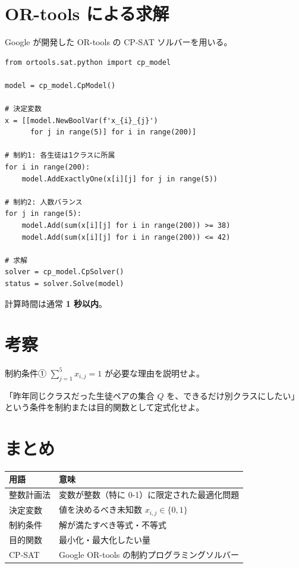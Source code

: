 \documentclass[a4paper, 11pt, fleqn]{ltjsarticle}
\begin{document}
\section{OR-tools による求解}

Google が開発した OR-tools の CP-SAT ソルバーを用いる。

\begin{verbatim}
from ortools.sat.python import cp_model

model = cp_model.CpModel()

# 決定変数
x = [[model.NewBoolVar(f'x_{i}_{j}')
      for j in range(5)] for i in range(200)]

# 制約1: 各生徒は1クラスに所属
for i in range(200):
    model.AddExactlyOne(x[i][j] for j in range(5))

# 制約2: 人数バランス
for j in range(5):
    model.Add(sum(x[i][j] for i in range(200)) >= 38)
    model.Add(sum(x[i][j] for i in range(200)) <= 42)

# 求解
solver = cp_model.CpSolver()
status = solver.Solve(model)
\end{verbatim}

計算時間は通常 \textbf{1 秒以内}。

\section{考察}

\mondai[基本]
制約条件① $\displaystyle\sum_{j=1}^{5} x_{i,j} = 1$ が必要な理由を説明せよ。

\begin{answerbox}
  \vspace{2.5cm}
\end{answerbox}

\mondai[発展]
「昨年同じクラスだった生徒ペアの集合 $Q$ を、できるだけ別クラスにしたい」
という条件を制約または目的関数として定式化せよ。

\begin{answerbox}
  \vspace{3.5cm}
\end{answerbox}

\section*{まとめ}

\begin{center}
\begin{tabular}{ll}
  \toprule
  用語 & 意味 \\
  \midrule
  整数計画法 & 変数が整数（特に 0-1）に限定された最適化問題 \\
  決定変数   & 値を決めるべき未知数 $x_{i,j} \in \{0,1\}$ \\
  制約条件   & 解が満たすべき等式・不等式 \\
  目的関数   & 最小化・最大化したい量 \\
  CP-SAT     & Google OR-tools の制約プログラミングソルバー \\
  \bottomrule
\end{tabular}
\end{center}
\end{document}
